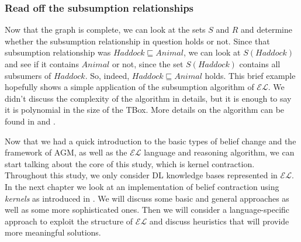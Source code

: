 \subsubsection{Read off the subsumption relationships}
Now that the graph is complete, we can look at the sets $S$ and $R$ and determine whether the subsumption relationship in question holds or not. Since that subsumption relationship was $Haddock \sqsubseteq Animal$, we can look at $S(Haddock)$ and see if it contains $Animal$ or not, since the set $S(Haddock)$ contains all subsumers of $Haddock$. So, indeed, $Haddock \sqsubseteq Animal$ holds. This brief example hopefully shows a simple application of the subsumption algorithm of $\mathcal{EL}$. We didn't discuss the complexity of the algorithm in details, but it is enough to say it is polynomial in the size of the TBox. More details on the algorithm can be found in \cite{small} and \cite{new}.

Now that we had a quick introduction to the basic types of belief change and the framework of AGM, as well as the $\mathcal{EL}$ language and reasoning algorithm, we can start talking about the core of this study, which is kernel contraction. Throughout this study, we only consider DL knowledge bases represented in $\mathcal{EL}$. In the next chapter we look at an implementation of belief contraction using \textit{kernels} as introduced in \cite{zwei}. We will discuss some basic and general approaches as well as some more sophisticated ones. Then we will consider a language-specific approach to exploit the structure of $\mathcal{EL}$ and discuss heuristics that will provide more meaningful solutions. 